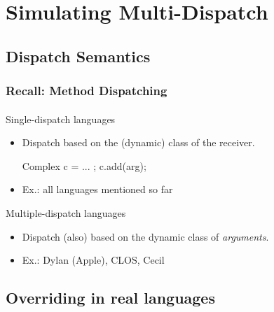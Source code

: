 \documentclass[handout]{beamer}
\begin{document}
\section{Simulating Multi-Dispatch}

\subsection{Dispatch Semantics}
\begin{frame}[fragile]
\frametitle{Recall: Method Dispatching}
\framesubtitle{}

Single-dispatch languages
\begin{itemize}
\item Dispatch based on the (dynamic) class of the receiver. 
\begin{cplus3}
     Complex c = ... ;   
     c.add(arg);
\end{cplus3}
\item Ex.: all languages mentioned so far

\end{itemize}

Multiple-dispatch languages
\begin{itemize}
\item Dispatch (also) based on the dynamic class of \textit{arguments}.
\item Ex.: Dylan (Apple), CLOS, Cecil
\end{itemize} 
\end{frame}


\subsection{Overriding in real languages}
\end{document}
